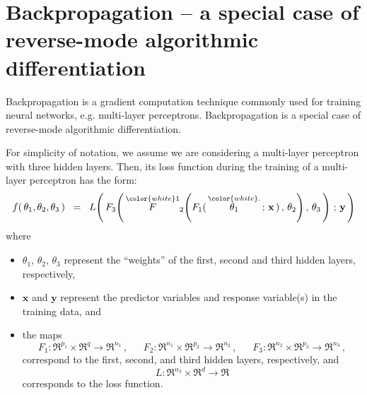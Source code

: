 

\section{Backpropagation -- a special case of reverse-mode algorithmic differentiation}
\setcounter{theorem}{0}
\setcounter{equation}{0}


\renewcommand{\theenumi}{\roman{enumi}}
\renewcommand{\labelenumi}{\textnormal{(\theenumi)}$\;\;$}


Backpropagation is a gradient computation technique commonly used
for training neural networks, e.g. multi-layer perceptrons.
Backpropagation is a special case of reverse-mode algorithmic differentiation.

\vskip 0.3cm
\noindent
For simplicity of notation, we assume we are considering a multi-layer perceptron
with three hidden layers.
Then, its loss function during the training of a multi-layer perceptron has the form:
\begin{equation}\label{objectiveFunctionMLP}
f(\,\theta_{1},\theta_{2},\theta_{3}\,)
\;\; = \;\;
	L\!\left(\,
		F_{3}\!\left(\,
			\overset{{\color{white}1}}{F}_{2}\!\left(
				F_{1}(\,\overset{{\color{white}.}}{\theta_{1}}\,;\,\mathbf{x}\,)\,,\,
				\theta_{2}\right),\,
			\theta_{3}\,\right)
		\,;\,\mathbf{y}\,\right)
\end{equation}
where
\begin{itemize}
\item
	$\theta_{1}$, $\theta_{2}$, $\theta_{3}$ represent the ``weights''
	of the first, second and third hidden layers, respectively,
\item
	$\mathbf{x}$ and $\mathbf{y}$ represent the predictor variables and
	response variable(s) in the training data, and
\item
	the maps
	\begin{equation*}
	F_{1} : \Re^{p_{1}} \times \Re^{q} \longrightarrow \Re^{n_{1}}\,,
	\quad\;\;
	F_{2} : \Re^{n_{1}} \times \Re^{p_{2}} \longrightarrow \Re^{n_{2}}\,,
	\quad\;\;
	F_{3} : \Re^{n_{2}} \times \Re^{p_{3}} \longrightarrow \Re^{n_{3}}\,,
	\end{equation*}
	correspond to the first, second, and third hidden layers, respectively,
	and
	\begin{equation*}
	L : \Re^{n_{3}} \times \Re^{d} \longrightarrow \Re
	\end{equation*}
	corresponds to the loss function. 
\end{itemize}

